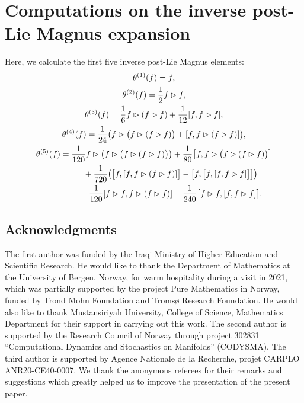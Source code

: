 \documentclass[pdftex]{sigma}
\numberwithin{equation}{section}
\begin{document}
\section{Computations on the inverse post-Lie Magnus expansion}
\label{C.ipl-Magnus}
Here, we calculate the first five inverse post-Lie Magnus elements:
\begin{gather*}
\theta^{(1)}(f) = f,
\\
\theta^{(2)}(f) = \frac{1}{2} f \rhd f ,
\\
\theta^{(3)}(f) = \frac{1}{6} f \rhd (f \rhd f) + \frac{1}{12} [f, f \rhd f] ,
\\
\theta^{(4)}(f) = \frac{1}{24} \big( f \rhd \big(f \rhd (f \rhd f)\big) + [f, f \rhd (f \rhd f)] \big),
\\
\theta^{(5)}(f) = \frac{1}{120} f \rhd \big( f \rhd \big(f \rhd (f \rhd f)\big)\big) + \frac{1}{80} \big[f, f \rhd \big(f \rhd (f \rhd f)\big)\big]
\\ \hphantom{\theta^{(5)}(f) =}
{}+ \frac{1}{720} \big( \big[f, [f, f \rhd (f \rhd f)]\big] - \big[f, \big[f, [f, f \rhd f]\big]\big]\big)
\\ \hphantom{\theta^{(5)}(f) =}
{}+ \frac{1}{120} [f \rhd f, f \rhd (f \rhd f)] - \frac{1}{240} \big[f \rhd f, [f, f \rhd f]\big].
\end{gather*}

\subsection*{Acknowledgments} The first author was funded by the Iraqi Ministry of Higher Education and Scientific Research. He would like to thank the Department of Mathematics at the University of Bergen, Norway, for warm hospitality during a visit in 2021, which was partially supported by the project Pure Mathematics in Norway, funded by Trond Mohn Foundation and Troms{\o} Research Foundation.
He would also like to thank Mustansiriyah University, College of Science, Mathematics Department for their support in carrying out this work. The second author is supported by the Research Council of Norway through project 302831 ``Computational Dynamics and Stochastics on Manifolds'' (CODYSMA). The third author is supported by Agence Nationale de la Recherche, projet CARPLO ANR20-CE40-0007. We thank the anonymous referees for their remarks and suggestions which greatly helped us to improve the presentation of the present paper.
\end{document}
